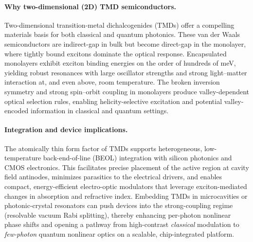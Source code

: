 \paragraph{Why two-dimensional (2D) TMD semiconductors.}
Two-dimensional transition-metal dichalcogenides (TMDs) offer a compelling materials basis for both classical and quantum photonics. These van der Waals semiconductors are indirect-gap in bulk but become direct-gap in the monolayer, where tightly bound excitons dominate the optical response. Encapsulated monolayers exhibit exciton binding energies on the order of hundreds of meV, yielding robust resonances with large oscillator strengths and strong light–matter interaction at, and even above, room temperature. The broken inversion symmetry and strong spin–orbit coupling in monolayers produce valley-dependent optical selection rules, enabling helicity-selective excitation and potential valley-encoded information in classical and quantum settings.

\paragraph{Integration and device implications.}
The atomically thin form factor of TMDs supports heterogeneous, low-temperature back-end-of-line (BEOL) integration with silicon photonics and CMOS electronics. This facilitates precise placement of the active region at cavity field antinodes, minimizes parasitics to the electrical drivers, and enables compact, energy-efficient electro-optic modulators that leverage exciton-mediated changes in absorption and refractive index. Embedding TMDs in microcavities or photonic-crystal resonators can push devices into the strong-coupling regime (resolvable vacuum Rabi splitting), thereby enhancing per-photon nonlinear phase shifts and opening a pathway from high-contrast \emph{classical} modulation to \emph{few-photon} quantum nonlinear optics on a scalable, chip-integrated platform.
